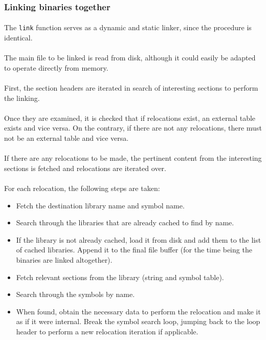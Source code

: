 \documentclass[12pt]{article}
\begin{document}
	\subsubsection{Linking binaries together}
	\paragraph{}The \verb|link| function serves as a dynamic and static linker, since the procedure is identical.
	\paragraph{}The main file to be linked is read from disk, although it could easily be adapted to operate directly from memory.
	\paragraph{}First, the section headers are iterated in search of interesting sections to perform the linking.
	\paragraph{}Once they are examined, it is checked that if relocations exist, an external table exists and vice versa. On the contrary, if there are not any relocations, there must not be an external table and vice versa.
	\paragraph{}If there are any relocations to be made, the pertinent content from the interesting sections is fetched and relocations are iterated over.
	\paragraph{}For each relocation, the following steps are taken:
	\begin{itemize}
		\item Fetch the destination library name and symbol name.
		\item Search through the libraries that are already cached to find by name.
		\item If the library is not already cached, load it from disk and add them to the list of cached libraries. Append it to the final file buffer (for the time being the binaries are linked altogether).
		\item Fetch relevant sections from the library (string and symbol table).
		\item Search through the symbols by name.
		\item When found, obtain the necessary data to perform the relocation and make it as if it were internal. Break the symbol search loop, jumping back to the loop header to perform a new relocation iteration if applicable.
	\end{itemize}
	
\end{document}
